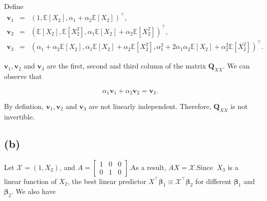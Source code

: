 \documentclass{article}
\begin{document}
Define 
\begin{eqnarray*}
\mathbf{v}_{1} &=&\left( 1,\mathbb{E}\left[ X_{2}\right] ,\alpha _{1}+\alpha
_{2}\mathbb{E}\left[ X_{2}\right] \right) ^{\intercal }, \\
\mathbf{v}_{2} &=&\left( \mathbb{E}\left[ X_{2}\right] ,\mathbb{E}\left[
X_{2}^{2}\right] ,\alpha _{1}\mathbb{E}\left[ X_{2}\right] +\alpha _{2}%
\mathbb{E}\left[ X_{2}^{2}\right] \right) ^{\intercal }, \\
\mathbf{v}_{3} &=&\left( \alpha _{1}+\alpha _{2}\mathbb{E}\left[ X_{2}\right]
,\alpha _{1}\mathbb{E}\left[ X_{2}\right] +\alpha _{2}\mathbb{E}\left[
X_{2}^{2}\right] ,\alpha _{1}^{2}+2\alpha _{1}\alpha _{2}\mathbb{E}\left[
X_{2}\right] +\alpha _{2}^{2}\mathbb{E}\left[ X_{2}^{2}\right] \right)
^{\intercal }.
\end{eqnarray*}

$\mathbf{v}_{1},\mathbf{v}_{2}$ and $\mathbf{v}_{3}$ are the first, second
and third column of the matrix $\mathbf{Q}_{XX}.$ We can observe that

\begin{equation*}
\alpha _{1}\mathbf{v}_{1}+\alpha _{2}\mathbf{v}_{2}=\mathbf{v}_{3}.
\end{equation*}

By defintion, $\mathbf{v}_{1},\mathbf{v}_{2}$ and $\mathbf{v}_{3}$ are not
linearly independent. Therefore, $\mathbf{Q}_{XX}$ is not invertible.

\subsection*{(b)}

Let $\mathcal{X}=\left( 1,X_{2}\right) $, and $A=\left[ 
\begin{array}{ccc}
1 & 0 & 0 \\ 
0 & 1 & 0%
\end{array}%
\right] .$As a result, $AX=\mathcal{X}.$Since $\ X_{3}$ is a linear function
of $X_{2}$, the best linear predictor $X^{\intercal }\mathbf{\beta }%
_{1}\equiv \mathcal{X}^{\intercal }\mathbf{\beta }_{2}$ for different $%
\mathbf{\beta }_{1}$ and $\mathbf{\beta }_{2}$. We also have
\end{document}

